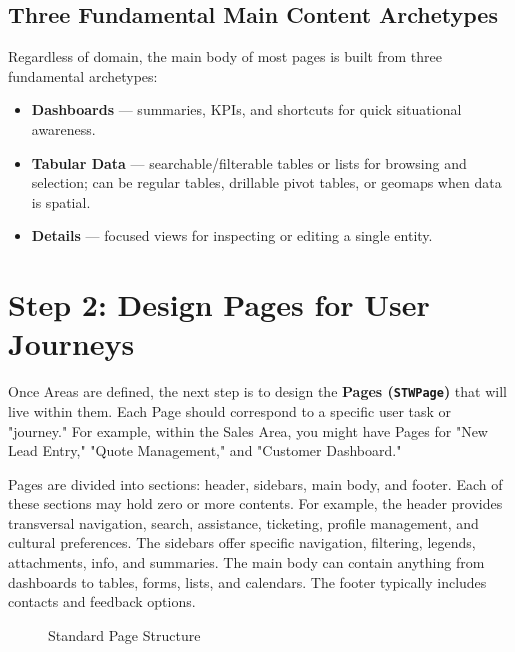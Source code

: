\subsection{Three Fundamental Main Content Archetypes}
Regardless of domain, the main body of most pages is built from three fundamental archetypes:
\begin{itemize}
  \item \textbf{Dashboards} — summaries, KPIs, and shortcuts for quick situational awareness.
  \item \textbf{Tabular Data} — searchable/filterable tables or lists for browsing and selection; can be regular tables, drillable pivot tables, or geomaps when data is spatial.
  \item \textbf{Details} — focused views for inspecting or editing a single entity.
\end{itemize}

\section{Step 2: Design Pages for User Journeys}
\label{sec:step2-pages}

Once Areas are defined, the next step is to design the \textbf{Pages (\texttt{STWPage})} that will live within them. Each Page should correspond to a specific user task or "journey." For example, within the Sales Area, you might have Pages for "New Lead Entry," "Quote Management," and "Customer Dashboard."

Pages are divided into sections: header, sidebars, main body, and footer. Each of these sections may hold zero or more contents. For example, the header provides transversal navigation, search, assistance, ticketing, profile management, and cultural preferences. The sidebars offer specific navigation, filtering, legends, attachments, info, and summaries. The main body can contain anything from dashboards to tables, forms, lists, and calendars. The footer typically includes contacts and feedback options.

\begin{figure}[h]
    \centering
    \caption{Standard Page Structure}
    \label{fig:page-structure}
\end{figure}

